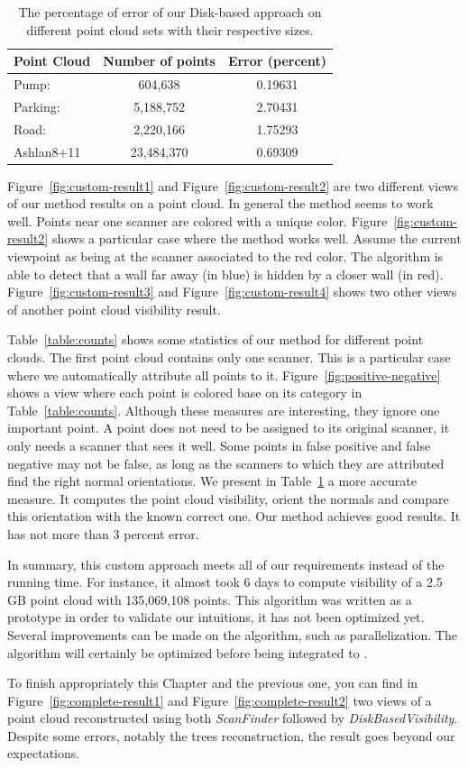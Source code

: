 \begin{table}[]
  \centering
  \begin{tabular}{l|c|c}
    Point Cloud & Number of points & Error (percent) \\\hline
    Pump: & 604,638 &  0.19631 \\\hline
    Parking: & 5,188,752 & 2.70431 \\\hline
    Road: & 2,220,166 & 1.75293 \\\hline
    Ashlan8+11 & 23,484,370 & 0.69309
  \end{tabular}
  \caption{The percentage of error of our Disk-based approach on different point cloud sets with their respective sizes.}
  \label{table:vis-error}
\end{table}
Figure~\ref{fig:custom-result1} and Figure~\ref{fig:custom-result2} are two different views of our method results on a point cloud. In general the method seems to work well. Points near one scanner are colored with a unique color. Figure~\ref{fig:custom-result2} shows a particular case where the method works well. Assume the current viewpoint as being at the scanner associated to the red color. The algorithm is able to detect that a wall far away (in blue) is hidden by a closer wall (in red). Figure~\ref{fig:custom-result3} and Figure~\ref{fig:custom-result4} shows two other views of another point cloud visibility result.

Table~\ref{table:counts} shows some statistics of our method for different point clouds. The first point cloud contains only one scanner. This is a particular case where we automatically attribute all points to it. Figure~\ref{fig:positive-negative} shows a view where each point is colored base on its category in Table~\ref{table:counts}. Although these measures are interesting, they ignore one important point. A point does not need to be assigned to its original scanner,
it only needs a scanner that sees it well. Some points in false positive and false negative may not be false, as long as the scanners to which they are attributed find the right normal orientations. We present in Table~\ref{table:vis-error} a more accurate measure. It computes the point cloud visibility, orient the normals and compare this orientation with the known correct one. Our method achieves good results. It has not more than $3$ percent error.

In summary, this custom approach meets all of our requirements instead of the running time. For instance, it almost took 6 days to compute visibility of a 2.5 GB point cloud with 135,069,108 points. This algorithm was written as a prototype in order to validate our intuitions, it has not been optimized yet. Several improvements can be made on the algorithm, such as parallelization. The algorithm will certainly be optimized before being integrated to \CC.

To finish appropriately this Chapter and the previous one, you can find in Figure~\ref{fig:complete-result1} and Figure~\ref{fig:complete-result2} two views of a point cloud reconstructed using both \emph{ScanFinder} followed by \emph{DiskBasedVisibility}. Despite some errors, notably the trees reconstruction, the result goes beyond our expectations.
